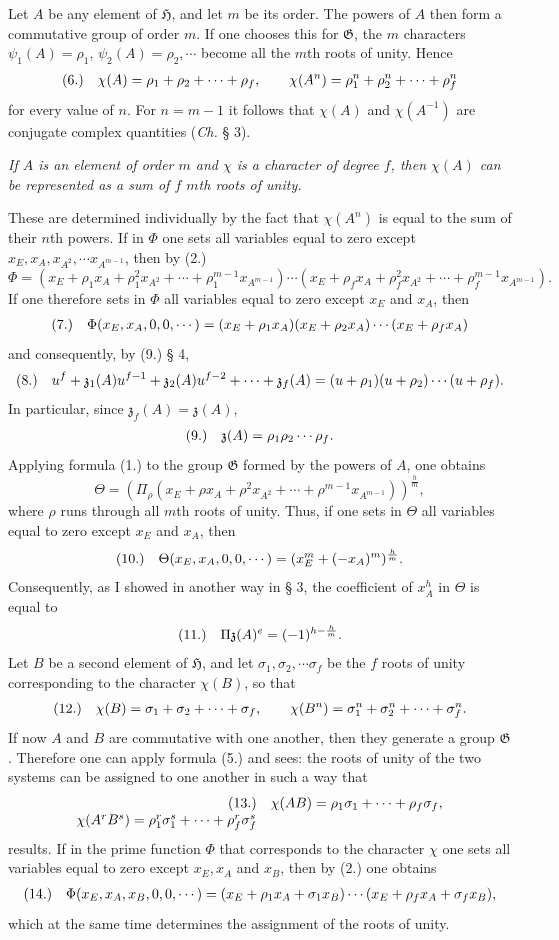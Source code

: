 \documentclass[11pt]{article}
\makeatletter
\newcommand{\Hgrp}{\mathfrak{H}}
\newcommand{\Ggrp}{\mathfrak{G}}
\newcommand{\zchar}{\mathfrak{z}}
\newcommand{\frobtagc}[2]{\[\begin{array}{@{}r@{\quad}c@{}}\textup{(#1)} & \displaystyle #2\end{array}\]}
\makeatother
\begin{document}
Let $A$ be any element of $\Hgrp$, and let $m$ be its order. The powers of $A$ then form a commutative group of order $m$. If one chooses this for $\Ggrp$, the $m$ characters $\psi_1(A)=\rho_1$, $\psi_2(A)=\rho_2,\cdots$ become all the $m$th roots of unity. Hence
\frobtagc{6.}{\chi(A)=\rho_1+\rho_2+\cdots+\rho_f,\qquad \chi(A^n)=\rho_1^n+\rho_2^n+\cdots+\rho_f^n}
for every value of $n$. For $n=m-1$ it follows that $\chi(A)$ and $\chi(A^{-1})$ are conjugate complex quantities (\emph{Ch.} § 3).

\emph{If $A$ is an element of order $m$ and $\chi$ is a character of degree $f$, then $\chi(A)$ can be represented as a sum of $f$ $m$th roots of unity.}

These are determined individually by the fact that $\chi(A^n)$ is equal to the sum of their $n$th powers. If in $\Phi$ one sets all variables equal to zero except $x_E,x_A,x_{A^2},\cdots x_{A^{m-1}}$, then by (2.)
\[
\Phi=(x_E+\rho_1x_A+\rho_1^2x_{A^2}+\cdots+\rho_1^{m-1}x_{A^{m-1}})\cdots(x_E+\rho_fx_A+\rho_f^2x_{A^2}+\cdots+\rho_f^{m-1}x_{A^{m-1}}).
\]
If one therefore sets in $\Phi$ all variables equal to zero except $x_E$ and $x_A$, then
\frobtagc{7.}{\Phi(x_E,x_A,0,0,\cdots)=(x_E+\rho_1x_A)(x_E+\rho_2x_A)\cdots(x_E+\rho_fx_A)}
and consequently, by (9.) § 4,
\frobtagc{8.}{u^f+\zchar_1(A)u^{f-1}+\zchar_2(A)u^{f-2}+\cdots+\zchar_f(A)=(u+\rho_1)(u+\rho_2)\cdots(u+\rho_f).}
In particular, since $\zchar_f(A)=\zchar(A)$,
\frobtagc{9.}{\zchar(A)=\rho_1\rho_2\cdots\rho_f.}
Applying formula (1.) to the group $\Ggrp$ formed by the powers of $A$, one obtains
\[
\Theta=\left(\Pi_\rho(x_E+\rho x_A+\rho^2x_{A^2}+\cdots+\rho^{m-1}x_{A^{m-1}})\right)^{\frac{h}{m}},
\]
where $\rho$ runs through all $m$th roots of unity. Thus, if one sets in $\Theta$ all variables equal to zero except $x_E$ and $x_A$, then
\frobtagc{10.}{\Theta(x_E,x_A,0,0,\cdots)=(x_E^m+(-x_A)^m)^{\frac{h}{m}}.}
Consequently, as I showed in another way in § 3, the coefficient of $x_A^h$ in $\Theta$ is equal to
\frobtagc{11.}{\Pi\zchar(A)^e=(-1)^{h-\frac{h}{m}}.}
Let $B$ be a second element of $\Hgrp$, and let $\sigma_1,\sigma_2,\cdots\sigma_f$ be the $f$ roots of unity corresponding to the character $\chi(B)$, so that
\frobtagc{12.}{\chi(B)=\sigma_1+\sigma_2+\cdots+\sigma_f,\qquad \chi(B^n)=\sigma_1^n+\sigma_2^n+\cdots+\sigma_f^n.}
If now $A$ and $B$ are commutative with one another, then they generate a group $\Ggrp$. Therefore one can apply formula (5.) and sees: the roots of unity of the two systems can be assigned to one another in such a way that
\frobtagc{13.}{\chi(AB)=\rho_1\sigma_1+\cdots+\rho_f\sigma_f,\\ \chi(A^rB^s)=\rho_1^r\sigma_1^s+\cdots+\rho_f^r\sigma_f^s}
results. If in the prime function $\Phi$ that corresponds to the character $\chi$ one sets all variables equal to zero except $x_E,x_A$ and $x_B$, then by (2.) one obtains
\frobtagc{14.}{\Phi(x_E,x_A,x_B,0,0,\cdots)=(x_E+\rho_1x_A+\sigma_1x_B)\cdots(x_E+\rho_fx_A+\sigma_fx_B),}
which at the same time determines the assignment of the roots of unity.
\end{document}
